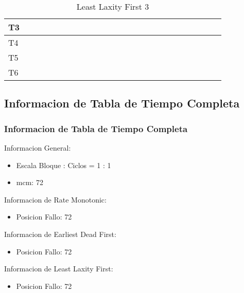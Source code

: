 \documentclass[xcolor=table]{beamer}
\begin{document}
\begin{frame}
\begin{table}
{\begin{tabular}{|l|l|l|l|l|l|l|l|l|l|l|l|l|l|l|l|l|l|l|l|l|l|l|l|l|}
T3 & & & & & & & & & & & & & & & & & & & & \cellcolor{cyan} & & & & \cellcolor{cyan} \\ \hline 
T4 & \cellcolor{gray} & & & \cellcolor{gray} & & & \cellcolor{gray} & & & \cellcolor{gray} & & & \cellcolor{gray} & & & \cellcolor{gray} & & & \cellcolor{gray} & & & & \cellcolor{gray} & \\ \hline 
T5 & & & \cellcolor{yellow} & & & \cellcolor{yellow} & & & \cellcolor{yellow} & & & \cellcolor{yellow} & & & \cellcolor{yellow} & & & \cellcolor{yellow} & & & & \cellcolor{yellow} & & \\ \hline 
T6 & & \cellcolor{orange} & & & \cellcolor{orange} & & & \cellcolor{orange} & & & \cellcolor{orange} & & & \cellcolor{orange} & & & \cellcolor{orange} & & & & \cellcolor{orange} & & & \\ \hline 
\end{tabular} 
} 
\caption{ Least Laxity First 3 } 
\end{table} 
\end{frame} 

\subsection{Informacion de Tabla de Tiempo Completa} 

\begin{frame} 
\frametitle{Informacion de Tabla de Tiempo Completa} 
Informacion General:\\ 
\begin{itemize} 
\item Escala Bloque : Ciclos = 1 : 1 \\ 
\item mcm:  72 \\ 
\end{itemize} 
Informacion de Rate Monotonic:\\ 
\begin{itemize} 
\item Posicion Fallo:  72 \\ 
\end{itemize} 
Informacion de Earliest Dead First:\\ 
\begin{itemize} 
\item Posicion Fallo:  72 \\ 
\end{itemize} 
Informacion de Least Laxity First:\\ 
\begin{itemize} 
\item Posicion Fallo:  72 \\ 
\end{itemize} 
\end{frame} 

\end{document}
